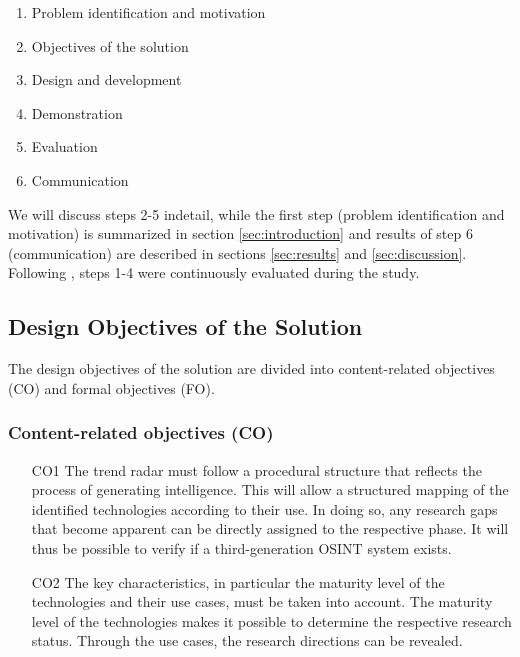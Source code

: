 \documentclass[10pt]{article}
\begin{document}
\begin{enumerate}
    \item Problem identification and motivation
    \item Objectives of the solution
    \item Design and development
    \item Demonstration
    \item Evaluation
    \item Communication
\end{enumerate}

We will discuss steps 2-5 indetail, while the first step (problem identification and motivation) is summarized in section \ref{sec:introduction} and results of step 6 (communication) are described in sections \ref{sec:results} and \ref{sec:discussion}. Following \cite{Sonnenberg.2012}, steps 1-4 were continuously evaluated during the study.




\subsection{Design Objectives of the Solution}

The design objectives of the solution are divided into content-related objectives (CO) and formal objectives (FO). 

\subsubsection*{Content-related objectives (CO)}

\begin{itemize}
    \item[CO1] The trend radar must follow a procedural structure that reflects the process of generating intelligence. This will allow a structured mapping of the identified technologies according to their use. In doing so, any research gaps that become apparent can be directly assigned to the respective phase. It will thus be possible to verify if a third-generation OSINT system exists.
    \item[CO2] The key characteristics, in particular the maturity level of the technologies and their use cases, must be taken into account. The maturity level of the technologies makes it possible to determine the respective research status. Through the use cases, the research directions can be revealed.
\end{itemize}
\end{document}
